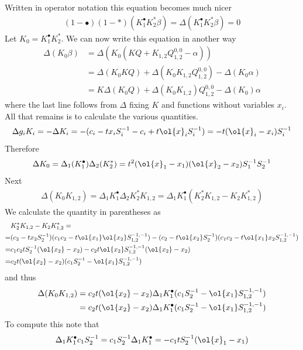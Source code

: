 Written in operator notation this equation becomes much nicer
\begin{align}
	(1-\bullet)(1-\ast)(K_1^\bullet K_2^\ast \beta) = \Delta(K_1^\bullet K_2^\ast \beta) = 0
\end{align}
Let $K_0 = K_1^\bullet K_2^\ast$. We can now write this equation in another way
\begin{align}
	\Delta(K_0\beta) &= \Delta(K_0(KQ + K_{1,2}Q_{1,2}^{0,0} - \alpha)) \\
	&= \Delta(K_0 KQ) +\Delta(K_0 K_{1,2}Q_{1,2}^{0,0}) - \Delta(K_0\alpha)\\
	&= K\Delta(K_0 Q) + \Delta(K_0 K_{1,2})Q_{1,2}^{0,0} - \Delta(K_0)\alpha
\end{align}
where the last line follows from $\Delta$ fixing $K$ and functions without variables $x_i$. All that remains is to calculate the various quantities.
\begin{align}
	\Delta g_iK_i = - \Delta K_i = - (c_i-tx_iS_i^{-1}-c_i + t\ol{x}_i S_i^{-1}) = -t(\ol{x}_i-x_i)S_i^{-1}
\end{align}
Therefore
\begin{align}
	\Delta K_0 = \Delta_1 (K_1^\bullet) \Delta_2 (K_2^\ast) = t^2(\ol{x}_1-x_1)(\ol{x}_2-x_2)S_1^{-1}S_2^{-1}
\end{align}
Next
\begin{align}
	\Delta(K_0 K_{1,2}) = \Delta_1 K_1^\bullet \Delta_2 K_2^\ast K_{1,2} = \Delta_1 K_1^\bullet (K_2^\ast K_{1,2}- K_2 K_{1,2}^\ast)
\end{align}
We calculate the quantity in parentheses as
\begin{align}
	&K_2^\ast K_{1,2}- K_2 K_{1,2}^\ast =\\
	=& (c_2-tx_2S_2^{-1})(c_1c_2-t\ol{x_1}\ol{x_2}S_{1,2}^{-1,-1})-(c_2-t\ol{x_2}S_2^{-1})(c_1c_2-t\ol{x_1}x_2S_{1,2}^{-1,-1})\\
	=&c_1c_2tS_2^{-1}(\ol{x_2}-x_2) - c_2t\ol{x_2}S_{1,2}^{-1,-1}(\ol{x_2}-x_2)\\
	=&c_2t(\ol{x_2}-x_2)(c_1S_2^{-1}-\ol{x_1}S_{1,2}^{-1,-1})
\end{align}
and thus
\begin{align}
	\Delta(K_0 K_{1,2})  &= c_2t(\ol{x_2}-x_2) \Delta_1 K_1^\bullet (c_1S_2^{-1}-\ol{x_1}S_{1,2}^{-1,-1})\\
	&=c_2t(\ol{x_2}-x_2) \Delta_1 K_1^\bullet (c_1S_2^{-1}-\ol{x_1}S_{1,2}^{-1,-1})\\
\end{align}
To compute this note that
\begin{align}
\Delta_1 K_1^\bullet c_1 S_2^{-1} = c_1 S_2^{-1}\Delta_1 K_1^\bullet = -c_1t S_2^{-1}(\ol{x}_1-x_1)
\end{align}
